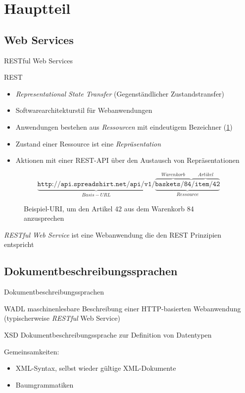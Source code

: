 \section{Hauptteil}

\subsection{Web Services}
\begin{frame}{RESTful Web Services}
    \begin{block}{REST}
        \begin{itemize}
            \item \emph{Representational State Transfer} (Gegenständlicher Zustandstransfer)
            \item Softwarearchitekturstil für Webanwendungen
            \item Anwendungen bestehen aus \emph{Ressourcen} mit eindeutigem Bezeichner (\cref{restURI}) %
            \item Zustand einer Ressource ist eine \emph{Repräsentation}
            \item Aktionen mit einer REST-API über den Austausch von Repräsentationen
        \end{itemize}
    \end{block}
\end{frame}

\begin{frame}
    \begin{figure}
        \centering
        \[
            \underbrace{\texttt{http://api.spreadshirt.net/api/v1/}}_{Basis-URL}\underbrace{\overbrace{\texttt{baskets/84}}^{Warenkorb}\overbrace{\texttt{/item/42}}^{Artikel}}_{Ressource}
        \]
        \caption{Beispiel-URI, um den Artikel 42 aus dem Warenkorb 84 anzusprechen}
        \label{restURI}
    \end{figure}
    \emph{RESTful Web Service} ist eine Webanwendung die den REST Prinzipien entspricht
\end{frame}

\subsection{Dokumentbeschreibungssprachen}
\begin{frame}[squeeze]{Dokumentbeschreibungssprachen}
    \begin{block}{WADL}
        maschinenlesbare Beschreibung einer HTTP-basierten Webanwendung (typischerweise \emph{RESTful} Web Service)
    \end{block}
    \begin{block}{XSD}
        Dokumentbeschreibungssprache zur Definition von Datentypen
    \end{block}
    Gemeinsamkeiten:
    \begin{itemize}
        \item XML-Syntax, selbst wieder gültige XML-Dokumente
        \item Baumgrammatiken
    \end{itemize}
\end{frame}

